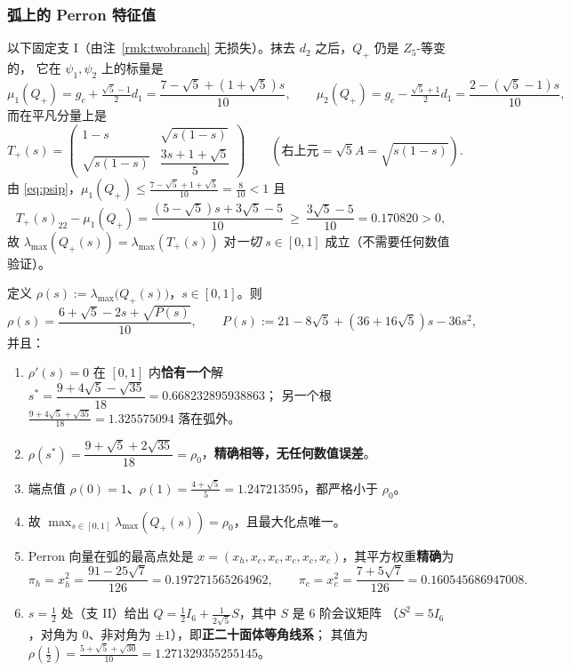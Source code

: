 \subsubsection*{弧上的 Perron 特征值}

以下固定支 I（由注~\ref{rmk:twobranch} 无损失）。抹去 $d_2$ 之后，$Q_+$ 仍是 $Z_5$-等变的，
它在 $\psi_1,\psi_2$ 上的标量是
\begin{equation}\label{eq:psip}
\mu_1(Q_+)=g_c+\tfrac{\sqrt5-1}2d_1=\frac{7-\sqrt5+(1+\sqrt5)s}{10},\qquad
\mu_2(Q_+)=g_c-\tfrac{\sqrt5+1}2d_1=\frac{2-(\sqrt5-1)s}{10},
\end{equation}
而在平凡分量上是
\[
T_+(s)=\begin{pmatrix}1-s & \sqrt{s(1-s)}\\[2pt] \sqrt{s(1-s)} & \dfrac{3s+1+\sqrt5}{5}\end{pmatrix}
\qquad(\text{右上元}=\sqrt5A=\sqrt{s(1-s)}).
\]
由 \eqref{eq:psip}，$\mu_1(Q_+)\le\frac{7-\sqrt5+1+\sqrt5}{10}=\frac8{10}<1$ 且
\[
T_+(s)_{22}-\mu_1(Q_+)=\frac{(5-\sqrt5)s+3\sqrt5-5}{10}\ \ge\ \frac{3\sqrt5-5}{10}=0.170820>0 ,
\]
故 $\lambda_{\max}(Q_+(s))=\lambda_{\max}(T_+(s))$ 对\emph{一切} $s\in[0,1]$ 成立（不需要任何数值验证）。

\begin{theorem}\label{thm:conefam}
定义 $\rho(s):=\lambda_{\max}\bigl(Q_+(s)\bigr)$，$s\in[0,1]$。则
\begin{equation}\label{eq:rhos}
\rho(s)=\frac{6+\sqrt5-2s+\sqrt{P(s)}}{10},\qquad
P(s):=21-8\sqrt5+(36+16\sqrt5)s-36s^2,
\end{equation}
并且：
\begin{enumerate}[label=(\alph*),leftmargin=2.2em]
\item $\rho'(s)=0$ 在 $[0,1]$ 内\textbf{恰有一个}解
$s^*=\dfrac{9+4\sqrt5-\sqrt{35}}{18}=0.668232895938863$；
另一个根 $\frac{9+4\sqrt5+\sqrt{35}}{18}=1.325575094$ 落在弧外。
\item $\rho(s^*)=\dfrac{9+\sqrt5+2\sqrt{35}}{18}=\rho_0$，\textbf{精确相等，无任何数值误差}。
\item 端点值 $\rho(0)=1$、$\rho(1)=\frac{4+\sqrt5}5=1.247213595$，都严格小于 $\rho_0$。
\item 故 $\displaystyle\max_{s\in[0,1]}\lambda_{\max}(Q_+(s))=\rho_0$，且最大化点唯一。
\item Perron 向量在弧的最高点处是 $x=(x_h,x_c,x_c,x_c,x_c,x_c)$，其平方权重\textbf{精确}为
\begin{equation}\label{eq:perronw}
\pi_h=x_h^2=\frac{91-25\sqrt7}{126}=0.197271565264962,\qquad
\pi_c=x_c^2=\frac{7+5\sqrt7}{126}=0.160545686947008 .
\end{equation}
\item $s=\frac12$ 处（支 II）给出 $Q=\frac12I_6+\frac1{2\sqrt5}S$，其中 $S$ 是 $6$ 阶会议矩阵
（$S^2=5I_6$，对角为 $0$、非对角为 $\pm1$），即\textbf{正二十面体等角线系}；
其值为 $\rho(\frac12)=\frac{5+\sqrt5+\sqrt{30}}{10}=1.271329355255145$。
\end{enumerate}
\end{theorem}

